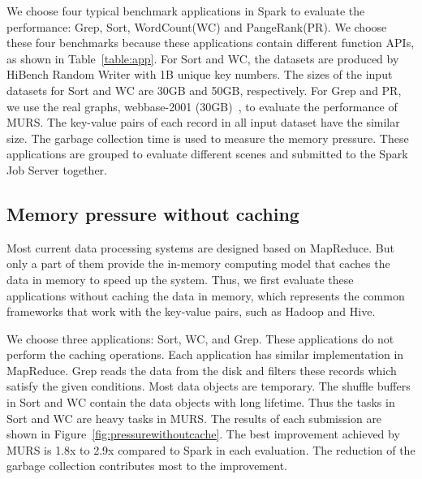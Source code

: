 We choose four typical benchmark applications in Spark to evaluate the performance: Grep, Sort, WordCount(WC) and PangeRank(PR). 
We choose these four benchmarks because these applications contain different function APIs, as shown in Table~\ref{table:app}. For Sort and WC, the datasets are produced by HiBench Random Writer with 1B unique key numbers. The sizes of the input datasets for Sort and WC are 30GB and 50GB, respectively. For Grep and PR, we use the real graphs, webbase-2001 (30GB)~\cite{boldi:webgraph}, to evaluate the performance of MURS. The key-value pairs of each record in all input dataset have the similar size. 
The garbage collection time is used to measure the memory pressure. These applications are grouped to evaluate different scenes and submitted to the Spark Job Server together.

\subsection{Memory pressure without caching}

Most current data processing systems are designed based on MapReduce. But only a part of them provide the in-memory computing model that caches the data in memory to speed up the system. Thus, we first evaluate these applications without caching the data in memory, which represents the common frameworks that work with the key-value pairs, such as Hadoop and Hive.

We choose three applications: Sort, WC, and Grep. These applications do not perform the caching operations. Each application has similar implementation in MapReduce. Grep reads the data from the disk and filters these records which satisfy the given conditions. Most data objects are temporary. The shuffle buffers in Sort and WC contain the data objects with long lifetime. Thus the tasks in Sort and WC are heavy tasks in MURS. The results of each submission are shown in Figure~\ref{fig:pressurewithoutcache}. The best improvement achieved by MURS is 1.8x to 2.9x compared to Spark in each evaluation. The reduction of the garbage collection contributes most to the improvement.

